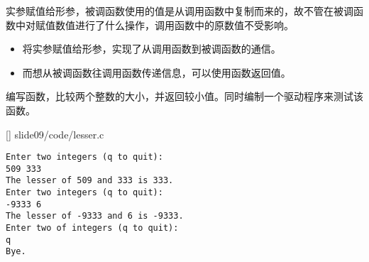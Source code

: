 \begin{frame}[fragile]
实参赋值给形参，被调函数使用的值是从调用函数中复制而来的，故不管在被调函数中对赋值数值进行了什么操作，调用函数中的原数值不受影响。
\end{frame}

\begin{frame}[fragile]
\begin{itemize}
\item
将实参赋值给形参，实现了从调用函数到被调函数的通信。\\[0.1in]
\item
而想从被调函数往调用函数传递信息，可以使用函数返回值。
\end{itemize}

\end{frame}

\begin{frame}[fragile]
  \begin{free}[例]{}
    编写函数，比较两个整数的大小，并返回较小值。同时编制一个驱动程序来测试该函数。
  \end{free}
\end{frame}

\begin{frame}

[]
{slide09/code/lesser.c}
\end{frame}

\begin{frame}[fragile]

\begin{lstlisting}[backgroundcolor=\color{red!10}]
Enter two integers (q to quit):
509 333
The lesser of 509 and 333 is 333.
Enter two integers (q to quit):
-9333 6
The lesser of -9333 and 6 is -9333.
Enter two of integers (q to quit):
q
Bye.
\end{lstlisting}
\end{frame}

